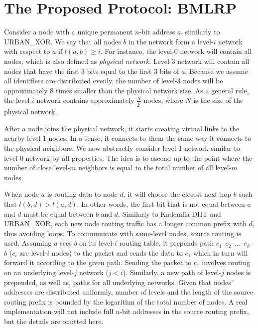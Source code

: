 \documentclass[conference]{IEEEtran}
\theoremstyle{definition}
\newcommand{\urbanxor}{URBAN\_XOR}
\begin{document}
\section{The Proposed Protocol:  BMLRP}
\label{sec:bmlrp}

Consider a node with a unique permanent $n$-bit address $a$, similarly to \urbanxor. We say that all nodes $b$ in the network form a level-$i$ network with respect to $a$ if $l(a,b) \ge i$. For instance, the level-0 network will contain all nodes, which is also defined as \emph{physical network}. Level-3 network will contain all nodes that have the first 3 bits equal to the first 3 bits of $a$. Because we assume all identifiers are distributed evenly, the number of level-3 nodes will be approximately 8 times smaller than the physical network size. As a general rule, the level-$i$ network contains approximately $\frac{N}{2^i}$ nodes, where $N$ is the size of the physical network.

After a node joins the physical network, it starts creating virtual links to the nearby level-1 nodes. In a sense, it connects to them the same way it connects to the physical neighbors. We now abstractly consider level-1 network similar to level-0 network by all properties. The idea is to ascend up to the point where the number of close level-$m$ neighbors is equal to the total number of all level-$m$ nodes. 



When node $a$ is routing data to node $d$, it will choose the closest next hop $b$ such that $l(b,d) > l(a,d)$. In other words, the first bit that is not equal between $a$ and $d$ must be equal between $b$ and $d$. Similarly to Kademlia DHT and \urbanxor, each new node routing traffic has a longer common prefix with $d$, thus avoiding loops. To communicate with same-level nodes, source routing is used. Assuming $a$ sees $b$ on its level-$i$ routing table, it prepends path $c_1$--$c_2$--...--$c_k$--$b$ ($c_i$ are level-$i$ nodes) to the packet and sends the data to $c_1$ which in turn will forward it according to the given path. Sending the packet to $c_1$ involves routing on an underlying level-$j$ network ($j < i$). Similarly, a new path of level-$j$ nodes is prepended, as well as, paths for all underlying networks. Given that nodes' addresses are distributed uniformly, number of levels and the length of the source routing prefix is bounded by the logarithm of the total number of nodes. A real implementation will not include full $n$-bit addresses in the source routing prefix, but the details are omitted here.
\end{document}
